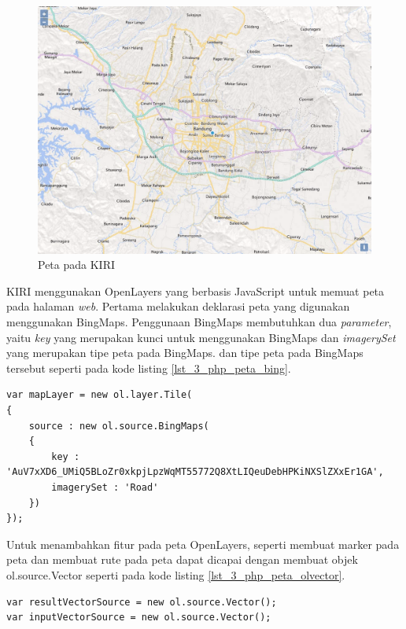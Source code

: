 \begin{figure}[H]
	\centering
	\includegraphics[scale=0.4]{Gambar/KIRI-peta}
	\caption{Peta pada KIRI} 
	\label{fig:3_KIRI_peta}
\end{figure}

KIRI menggunakan OpenLayers yang berbasis JavaScript untuk memuat peta pada halaman \textit{web}. Pertama melakukan deklarasi peta yang digunakan menggunakan BingMaps. Penggunaan BingMaps membutuhkan dua \textit{parameter}, yaitu \textit{key} yang merupakan kunci untuk menggunakan BingMaps dan \textit{imagerySet} yang merupakan tipe peta pada BingMaps. dan tipe peta pada BingMaps tersebut seperti pada kode listing \ref{lst_3_php_peta_bing}.

\begin{lstlisting}[caption=Deklarasi peta BingMaps,label = {lst_3_php_peta_bing}]
var mapLayer = new ol.layer.Tile(
{
	source : new ol.source.BingMaps(
	{
		key : 'AuV7xXD6_UMiQ5BLoZr0xkpjLpzWqMT55772Q8XtLIQeuDebHPKiNXSlZXxEr1GA',
		imagerySet : 'Road'
	})
});
\end{lstlisting}


Untuk menambahkan fitur pada peta OpenLayers, seperti membuat marker pada peta dan membuat rute pada peta dapat dicapai dengan membuat objek ol.source.Vector seperti pada kode listing \ref{lst_3_php_peta_olvector}.

\begin{lstlisting}[caption=Objek ol.source.Vector,label = {lst_3_php_peta_olvector}]
var resultVectorSource = new ol.source.Vector();
var inputVectorSource = new ol.source.Vector();
\end{lstlisting}

